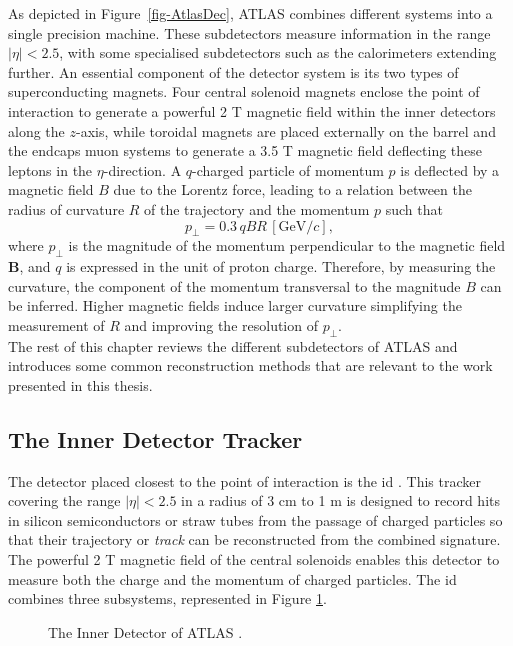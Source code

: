 As depicted in Figure~\ref{fig-AtlasDec}, ATLAS combines different systems into a single precision machine. These subdetectors measure information in the range $|\eta|<  2.5$, with some specialised subdetectors such as the calorimeters extending further. An essential component of the detector system is its two types of superconducting magnets. Four central solenoid magnets enclose the point of interaction to generate a powerful 2 T magnetic field within the inner detectors along the $z$-axis, while toroidal magnets are placed externally on the barrel and the endcaps muon systems to generate a 3.5 T magnetic field deflecting these leptons in the $\eta$-direction. A $q$-charged particle of momentum $p$ is deflected by a magnetic field $B$ due to the Lorentz force, leading to a relation between the radius of curvature $R$ of the trajectory and the momentum $p$ such that 
\begin{equation}
  p_{\perp} = 0.3 \, qBR \, [\text{GeV}/c],
\end{equation}
where $p_{\perp}$ is the magnitude of the momentum perpendicular to the magnetic field $\boldsymbol{B}$, and $q$ is expressed in the unit of proton charge. Therefore, by measuring the curvature, the component of the momentum transversal to the magnitude $B$ can be inferred. Higher magnetic fields induce larger curvature simplifying the measurement of $R$ and improving the resolution of $p_{\perp}$. \\ 

The rest of this chapter reviews the different subdetectors of ATLAS and introduces some common reconstruction methods that are relevant to the work presented in this thesis. 

\subsection{The Inner Detector Tracker}
The detector placed closest to the point of interaction is the \gls{id} \cite{CERN-LHCC-97-016}. This tracker covering the range $|\eta| < 2.5$ in a radius of 3 cm to 1 m is designed to record hits in silicon semiconductors or straw tubes from the passage of charged particles so that their trajectory or \textit{track} can be reconstructed from the combined signature. The powerful 2 T magnetic field of the central solenoids enables this detector to measure both the charge and the momentum of charged particles. The \gls{id} combines three subsystems, represented in Figure \ref{fig-AtlasDecID}. 

\begin{figure}[!h]
  \centering
  \hspace{-1.25cm}
  \caption{The Inner Detector of ATLAS \cite{ATLASschematics}.}
  \label{fig-AtlasDecID}
\end{figure}

